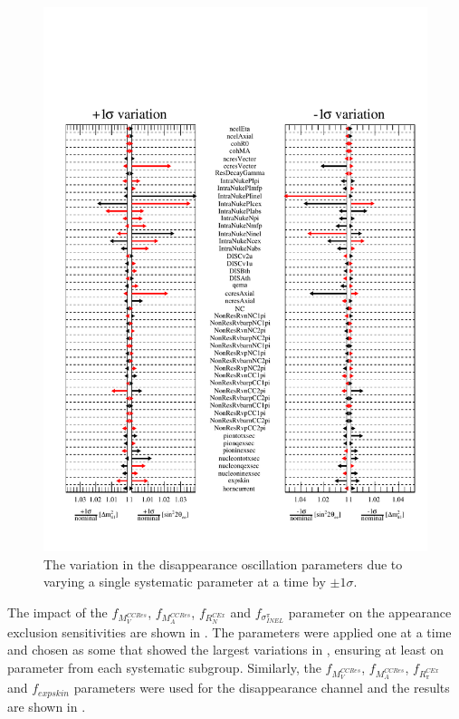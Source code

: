 \begin{figure}[h!]
    \centering
    \includegraphics[width = \largefigwidth]{figures-chap6/star_plot/nue_dsisapp_pulls.pdf}
    \caption[\nue disappearance oscillation parameter pulls due to varying a single systematic parameter by $\pm1\sigma$.]{The variation in the \nue disappearance oscillation parameters due to varying a single systematic parameter at a time by $\pm1\sigma$.}
    \label{fig:nue_disapp_osc_param_pulls}
\end{figure}

The impact of the $f_{M_V^{CCRes}}$, $f_{M_A^{CCRes}}$, $f_{R_N^{C Ex}}$ and $f_{\sigma^{\pi}_{INEL}}$ parameter on the \nue appearance exclusion sensitivities are shown in . The parameters were applied one at a time and chosen as some that showed the largest variations in , ensuring at least on parameter from each systematic subgroup. Similarly, the $f_{M_V^{CCRes}}$, $f_{M_A^{CCRes}}$, $f_{R_{\pi}^{C Ex}}$ and $f_{expskin}$ parameters were used for the \nue disappearance channel and the results are shown in .

